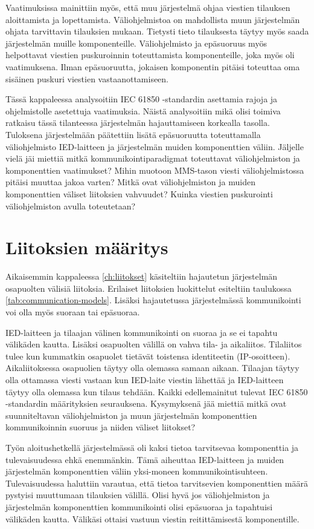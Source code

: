 Vaatimuksissa mainittiin myös, että muu järjestelmä ohjaa viestien tilauksen aloittamista ja lopettamista. Väliohjelmistoa on mahdollista muun järjestelmän ohjata tarvittavin tilauksien mukaan. Tietysti tieto tilauksesta täytyy myös saada järjestelmän muille komponenteille. Väliohjelmisto ja epäsuoruus myös helpottavat viestien puskuroinnin toteuttamista komponenteille, joka myös oli vaatimuksena. Ilman epäsuoruutta, jokaisen komponentin pitäisi toteuttaa oma sisäinen puskuri viestien vastaanottamiseen.

Tässä kappaleessa analysoitiin IEC 61850 -standardin asettamia rajoja ja ohjelmistolle asetettuja vaatimuksia. Näistä analysoitiin mikä olisi toimiva ratkaisu tässä tilanteessa järjestelmän hajauttamiseen korkealla tasolla. Tuloksena järjestelmään päätettiin lisätä epäsuoruutta toteuttamalla väliohjelmisto IED-laitteen ja järjestelmän muiden komponenttien väliin. Jäljelle vielä jäi miettiä mitkä kommunikointiparadigmat toteuttavat väliohjelmiston ja komponenttien vaatimukset? Mihin muotoon MMS-tason viesti väliohjelmistossa pitäisi muuttaa jakoa varten? Mitkä ovat väliohjelmiston ja muiden komponenttien väliset liitoksien vahvuudet? Kuinka viestien puskurointi väliohjelmiston avulla toteutetaan?


\section{Liitoksien määritys}
Aikaisemmin kappaleessa \ref{ch:liitokset} käsiteltiin hajautetun järjestelmän osapuolten välisiä liitoksia. Erilaiset liitoksien luokittelut esiteltiin taulukossa \ref{tab:communication-models}. Lisäksi hajautetussa järjestelmässä kommunikointi voi olla myös suoraan tai epäsuoraa.

IED-laitteen ja tilaajan välinen kommunikointi on suoraa ja se ei tapahtu välikäden kautta. Lisäksi osapuolten välillä on vahva tila- ja aikaliitos. Tilaliitos tulee kun kummatkin osapuolet tietävät toistensa identiteetin (IP-osoitteen). Aikaliitoksessa osapuolien täytyy olla olemassa samaan aikaan. Tilaajan täytyy olla ottamassa viesti vastaan kun IED-laite viestin lähettää ja IED-laitteen täytyy olla olemassa kun tilaus tehdään. Kaikki edellemainitut tulevat IEC 61850 -standardin määrityksien seurauksena. Kysymyksenä jää miettiä mitkä ovat suunniteltavan väliohjelmiston ja muun järjestelmän komponenttien kommunikoinnin suoruus ja niiden väliset liitokset?

Työn aloitushetkellä järjestelmässä oli kaksi tietoa tarvitsevaa komponenttia ja tulevaisuudessa ehkä enemmänkin. Tämä aiheuttaa IED-laitteen ja muiden järjestelmän komponenttien väliin yksi-moneen kommunikointisuhteen. Tulevaisuudessa haluttiin varautua, että tietoa tarvitsevien komponenttien määrä pystyisi muuttumaan tilauksien välillä. Olisi hyvä jos väliohjelmiston ja järjestelmän komponenttien kommunikointi olisi epäsuoraa ja tapahtuisi välikäden kautta. Välikäsi ottaisi vastuun viestin reitittämisestä komponentille.


